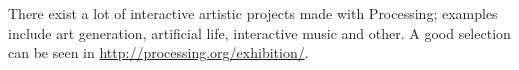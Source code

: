 There exist a lot of interactive artistic projects made with
Processing; examples include art generation, artificial life,
interactive music and other. A good selection can be seen in
\url{http://processing.org/exhibition/}. %



